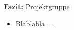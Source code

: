 {
  {\bf Fazit:} Projektgruppe \glqq \TPMLTWOZERO \grqq
  \begin{itemize}
    \item Blablabla ...
  \end{itemize}
}